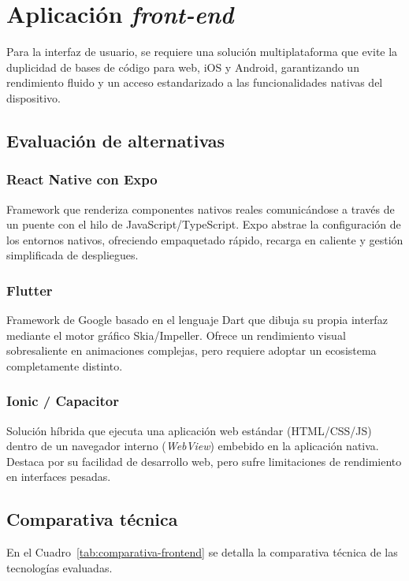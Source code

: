 \section{Aplicación \emph{front-end}}

Para la interfaz de usuario, se requiere una solución multiplataforma que evite la duplicidad de bases de código para web, iOS y Android, garantizando un rendimiento fluido y un acceso estandarizado a las funcionalidades nativas del dispositivo.

\subsection*{Evaluación de alternativas}

\subsubsection*{React Native con Expo}
Framework que renderiza componentes nativos reales comunicándose a través de un puente con el hilo de JavaScript/TypeScript. Expo abstrae la configuración de los entornos nativos, ofreciendo empaquetado rápido, recarga en caliente y gestión simplificada de despliegues.

\subsubsection*{Flutter}
Framework de Google basado en el lenguaje Dart que dibuja su propia interfaz mediante el motor gráfico Skia/Impeller. Ofrece un rendimiento visual sobresaliente en animaciones complejas, pero requiere adoptar un ecosistema completamente distinto.

\subsubsection*{Ionic / Capacitor}
Solución híbrida que ejecuta una aplicación web estándar (HTML/CSS/JS) dentro de un navegador interno (\emph{WebView}) embebido en la aplicación nativa. Destaca por su facilidad de desarrollo web, pero sufre limitaciones de rendimiento en interfaces pesadas.

\subsection*{Comparativa técnica}

En el Cuadro~\ref{tab:comparativa-frontend} se detalla la comparativa técnica de las tecnologías evaluadas.

